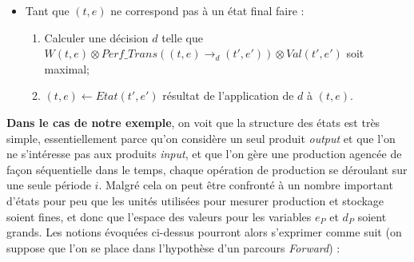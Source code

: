\begin{itemize}[label=$\square$]
\begin{itemize}
	\item Tant que $(t, e)$ ne correspond pas à un état final faire :
	\begin{enumerate}
		\item Calculer une décision $d$ telle que $W(t, e) \otimes Perf\_Trans((t, e) \rightarrow_{d} (t', e')) \otimes Val(t', e')$ soit maximal;
		
		\item $(t, e) \leftarrow Etat (t', e')$ résultat de l'application de $d$ à $(t, e)$.
	\end{enumerate}
\end{itemize}
\end{itemize}

\textbf{Dans le cas de notre exemple}, on voit que la structure des états est très simple, essentiellement parce qu'on considère un seul produit \textit{output} et que l'on ne s'intéresse pas aux produits \textit{input}, et que l'on gère une production agencée de façon séquentielle dans le temps, chaque opération de production se déroulant sur une seule période $i$. Malgré cela on peut être confronté à un nombre important d'états pour peu que les unités utilisées pour mesurer production et stockage soient fines, et donc que l'espace des valeurs pour les variables $e_P$ et $d_P$ soient grands. Les notions évoquées ci-dessus pourront alors s'exprimer comme suit (on suppose que l'on se place dans l'hypothèse d'un parcours \textit{Forward}) :
